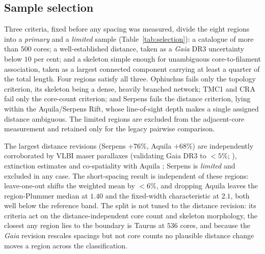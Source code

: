 \documentclass[usenatbib,twoside,twocolumn]{mnras}
\begin{document}
\subsection{Sample selection}
\label{sec:distance_uncertainties}

Three criteria, fixed before any spacing was measured, divide the eight regions into a \emph{primary} and a \emph{limited} sample (Table~\ref{tab:selection}): a catalogue of more than $500$ cores; a well-established distance, taken as a \textit{Gaia} DR3 uncertainty below $10$ per cent; and a skeleton simple enough for unambiguous core-to-filament association, taken as a largest connected component carrying at least a quarter of the total length. Four regions satisfy all three. Ophiuchus fails only the topology criterion, its skeleton being a dense, heavily branched network; TMC1 and CRA fail only the core-count criterion; and Serpens fails the distance criterion, lying within the Aquila/Serpens Rift, whose line-of-sight depth makes a single assigned distance ambiguous. The limited regions are excluded from the adjacent-core measurement and retained only for the legacy pairwise comparison.

 The largest distance revisions (Serpens $+76\%$, Aquila $+68\%$) are independently corroborated by VLBI maser parallaxes (validating Gaia DR3 to $<5\%$; \citealt{Kounkel2018,Xu2021,OrtizLeon2018,OrtizLeon2017}), extinction estimates \citep{Yan2022,Green2024} and co-spatiality with Aquila \citep{Zucker2020}; Serpens is \emph{limited} and excluded in any case. The short-spacing result is independent of these regions: leave-one-out shifts the weighted mean by $<6\%$, and dropping Aquila leaves the region-Plummer median at $1.40$ and the fixed-width characteristic at $2.1$, both well below the reference band. The split is not tuned to the distance revision: its criteria act on the distance-independent core count and skeleton morphology, the closest any region lies to the boundary is Taurus at $536$ cores, and because the \textit{Gaia} revision rescales spacings but not core counts no plausible distance change moves a region across the classification.
\end{document}
